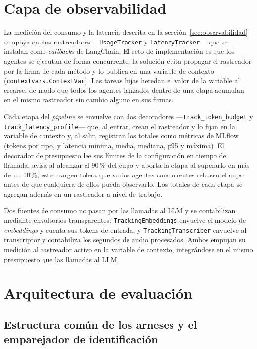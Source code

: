 \section{Capa de observabilidad}
\label{anx:observabilidad}

La medición del consumo y la latencia descrita en la sección~\ref{sec:observabilidad} se apoya en
dos rastreadores —\texttt{UsageTracker} y \texttt{LatencyTracker}— que se instalan como
\textit{callbacks} de LangChain. El reto de implementación es que los agentes se ejecutan de forma
concurrente: la solución evita propagar el rastreador por la firma de cada método y lo publica en
una variable de contexto (\texttt{contextvars.ContextVar}). Las tareas hijas heredan el valor de la
variable al crearse, de modo que todos los agentes lanzados dentro de una etapa acumulan en el
mismo rastreador sin cambio alguno en sus firmas.

Cada etapa del \textit{pipeline} se envuelve con dos decoradores —\texttt{track\_token\_budget} y
\texttt{track\_latency\_profile}— que, al entrar, crean el rastreador y lo fijan en la variable de
contexto y, al salir, registran los totales como métricas de MLflow (tokens por tipo, y latencia
mínima, media, mediana, p95 y máxima). El decorador de presupuesto lee sus límites de la
configuración en tiempo de llamada, avisa al alcanzar el 90\,\% del cupo y aborta la etapa al
superarlo en más de un 10\,\%; este margen tolera que varios agentes concurrentes rebasen el cupo
antes de que cualquiera de ellos pueda observarlo. Los totales de cada etapa se agregan además en
un rastreador a nivel de trabajo.

Dos fuentes de consumo no pasan por las llamadas al LLM y se contabilizan mediante envoltorios
transparentes: \texttt{TrackingEmbeddings} envuelve el modelo de \textit{embeddings} y cuenta sus
tokens de entrada, y \texttt{TrackingTranscriber} envuelve al transcriptor y contabiliza los
segundos de audio procesados. Ambos empujan su medición al rastreador activo en la variable de
contexto, integrándose en el mismo presupuesto que las llamadas al LLM.

\section{Arquitectura de evaluación}

\subsection{Estructura común de los arneses y el emparejador de identificación}
\label{anx:harnesses-eval}

